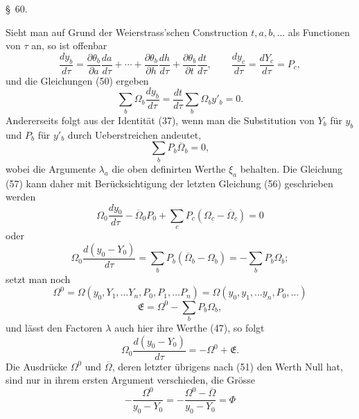 \documentclass[11pt,a4paper,leqno]{article}
\begin{document}

\begin{center}
{\large \S~60.}
\end{center}

Sieht man auf Grund der Weierstrass'schen Construction
$t,a,b,\ldots$ als Functionen von $\tau$ an, so ist offenbar
\begin{equation}\tag{56}
\frac{dy_b}{d\tau}
=\frac{\partial\theta_b}{\partial a}\frac{da}{d\tau}
+\cdots+
\frac{\partial\theta_b}{\partial h}\frac{dh}{d\tau}
+\frac{\partial\theta_b}{\partial t}\frac{dt}{d\tau},\qquad
\frac{dy_c}{d\tau}=\frac{dY_c}{d\tau}=P_c,
\end{equation}
und die Gleichungen (50) ergeben
\begin{equation}\tag{57}
\sum_b\Omega_b\frac{dy_b}{d\tau}
=\frac{dt}{d\tau}\sum_b\Omega_b y'_b=0.
\end{equation}
Andererseits folgt aus der Identität (37), wenn man die Substitution
von $Y_b$ für $y_b$ und $P_b$ für $y'_b$ durch Ueberstreichen
andeutet,
\[
\sum_b P_b\overline{\Omega}_b=0,
\]
wobei die Argumente $\lambda_a$ die oben definirten Werthe $\xi_a$
behalten. Die Gleichung (57) kann daher mit Berücksichtigung der
letzten Gleichung (56) geschrieben werden
\[
\Omega_0\frac{dy_0}{d\tau}-\overline{\Omega}_0P_0
+\sum_c P_c(\Omega_c-\overline{\Omega}_c)=0
\]
oder
\[
\Omega_0\frac{d(y_0-Y_0)}{d\tau}
=\sum_b P_b(\overline{\Omega}_b-\Omega_b)
=-\sum_b P_b\Omega_b;
\]
setzt man noch
\[
\Omega^0=\Omega(y_0,Y_1,\ldots Y_n,P_0,P_1,\ldots P_n)
=\Omega(y_0,y_1,\ldots y_n,P_0,\ldots)
\]
\[
\mathfrak{E}=\Omega^0-\sum_b P_b\Omega_b,
\]
und lässt den Factoren $\lambda$ auch hier ihre Werthe (47), so folgt
\begin{equation}\tag{58}
\Omega_0\frac{d(y_0-Y_0)}{d\tau}=-\Omega^0+\mathfrak{E}.
\end{equation}
Die Ausdrücke $\Omega^0$ und $\overline{\Omega}$, deren letzter übrigens
nach (51) den Werth Null hat, sind nur in ihrem ersten Argument
verschieden, die Grösse
\[
-\frac{\Omega^0}{y_0-Y_0}
=-\frac{\Omega^0-\overline{\Omega}}{y_0-Y_0}=\Phi
\]
\end{document}
